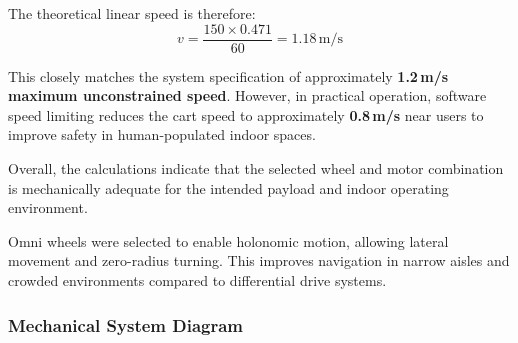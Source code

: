 The theoretical linear speed is therefore:
\begin{equation}
  v = \frac{150 \times 0.471}{60} = 1.18\,\mathrm{m/s}
\end{equation}

This closely matches the system specification of approximately
\textbf{1.2\,m/s maximum unconstrained speed}. However, in practical
operation, software speed limiting reduces the cart speed to
approximately \textbf{0.8\,m/s} near users to improve safety in
human-populated indoor spaces.

Overall, the calculations indicate that the selected wheel and motor
combination is mechanically adequate for the intended payload and indoor
operating environment.

Omni wheels were selected to enable holonomic motion, allowing lateral movement and zero-radius turning. This improves navigation in narrow aisles and crowded environments compared to differential drive systems.

\subsubsection{Mechanical System Diagram}

